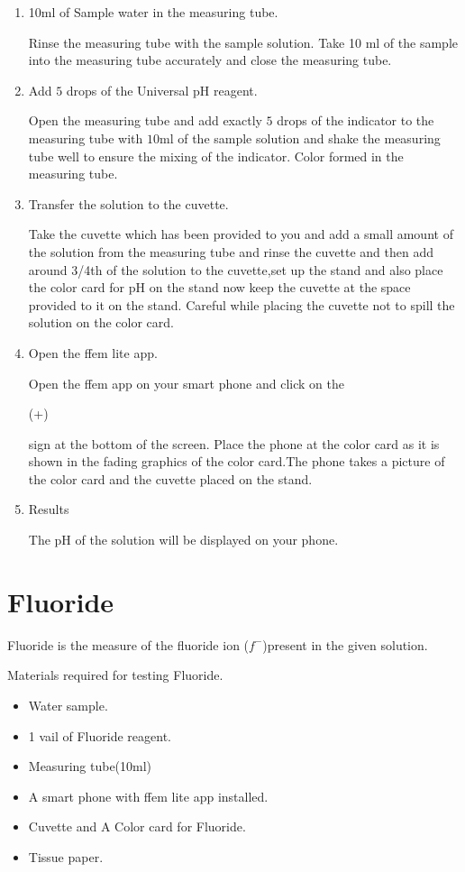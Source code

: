 \documentclass{article}
\begin{document}
\begin{enumerate}
\item 10ml of Sample water in the measuring tube.

Rinse the measuring tube with the sample solution.
Take 10 ml of the sample into the measuring tube accurately and close the measuring tube. 
\item Add $5$ drops of the Universal pH reagent.

Open the measuring tube and add exactly $5$ drops of the indicator to the measuring tube with $10$ml of the sample solution and shake the measuring tube well to ensure the mixing of the indicator. Color formed in the measuring tube.
\item Transfer the solution to the cuvette.

Take the cuvette which has been provided to you and add a small amount of the solution from the measuring tube and rinse the cuvette and then add around 3/4th of the solution to the cuvette,set up the stand and also place the color card for pH on the stand now keep the cuvette at the space provided to it on the stand. Careful while placing the cuvette not to spill the solution on the color card.
 \item Open the ffem lite app.
 
 Open the ffem app on your smart phone and click on the  \begin{large}(+)\end{large}sign at the bottom of the screen. Place the phone at the color card as it is shown in the fading graphics of the color card.The phone takes a picture of the color card and the cuvette placed on the stand.
 \item Results  
 
 The pH of the solution will be displayed on your phone.
 
\end{enumerate} 


\section{Fluoride}
    
Fluoride is the measure of the fluoride ion  ($f^-$)present in the given solution.
   
Materials required for testing Fluoride.
  \begin{itemize}
  \item Water sample.
  \item 1 vail of Fluoride reagent.
  \item Measuring tube(10ml)
  \item A smart phone with ffem lite app installed.
  \item  Cuvette and A Color card for Fluoride.
  \item Tissue paper.
  \end{itemize}
  
\end{document}
